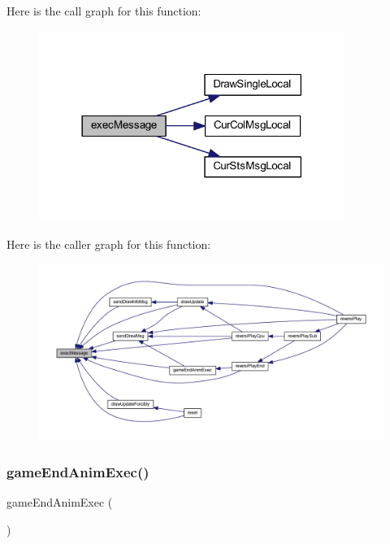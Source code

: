 Here is the call graph for this function\+:\nopagebreak
\begin{figure}[H]
\begin{center}
\leavevmode
\includegraphics[width=282pt]{class_reversi_play_ae8beea2648c1c5cf722364e84a90edf9_cgraph}
\end{center}
\end{figure}
Here is the caller graph for this function\+:\nopagebreak
\begin{figure}[H]
\begin{center}
\leavevmode
\includegraphics[width=350pt]{class_reversi_play_ae8beea2648c1c5cf722364e84a90edf9_icgraph}
\end{center}
\end{figure}
\mbox{\label{class_reversi_play_acbcd366da8242203ae52fb685fbc929e}} 
\subsubsection{\texorpdfstring{game\+End\+Anim\+Exec()}{gameEndAnimExec()}}
{\footnotesize\ttfamily game\+End\+Anim\+Exec (\begin{DoxyParamCaption}{ }\end{DoxyParamCaption})}



